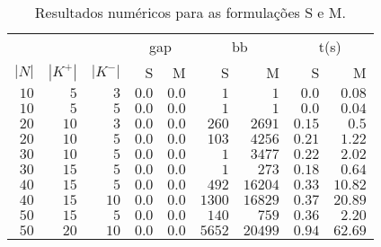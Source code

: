 \documentclass{article}
\begin{document}
\begin{table}[h]
	\centering
	\caption{Resultados numéricos para as formulações S e M.\label{tab:q2-table}}
	\begin{tabular}[h]{rrrrrrrrr}
		\toprule
		\multicolumn{3}{c}{}      & \multicolumn{2}{c}{gap}       & \multicolumn{2}{c}{bb}        & \multicolumn{2}{c}{t(s)}                                               \\
		\cmidrule(lr){4-5} \cmidrule(lr){6-7} \cmidrule(lr){8-9}
		\multicolumn{1}{c}{$|N|$} & \multicolumn{1}{c}{$|K^{+}|$} & \multicolumn{1}{c}{$|K^{-}|$} & S                        & M     & S      & M       & S      & M       \\
		\midrule
		$10$                      & $5$                           & $3$                           & $0.0$                    & $0.0$ & $1$    & $1$     & $0.0$  & $0.08$  \\
		$10$                      & $5$                           & $5$                           & $0.0$                    & $0.0$ & $1$    & $1$     & $0.0$  & $0.04$  \\
		$20$                      & $10$                          & $3$                           & $0.0$                    & $0.0$ & $260$  & $2691$  & $0.15$ & $0.5$   \\
		$20$                      & $10$                          & $5$                           & $0.0$                    & $0.0$ & $103$  & $4256$  & $0.21$ & $1.22$  \\
		$30$                      & $10$                          & $5$                           & $0.0$                    & $0.0$ & $1$    & $3477$  & $0.22$ & $2.02$  \\
		$30$                      & $15$                          & $5$                           & $0.0$                    & $0.0$ & $1$    & $273$   & $0.18$ & $0.64$  \\
		$40$                      & $15$                          & $5$                           & $0.0$                    & $0.0$ & $492$  & $16204$ & $0.33$ & $10.82$ \\
		$40$                      & $15$                          & $10$                          & $0.0$                    & $0.0$ & $1300$ & $16829$ & $0.37$ & $20.89$ \\
		$50$                      & $15$                          & $5$                           & $0.0$                    & $0.0$ & $140$  & $759$   & $0.36$ & $2.20$  \\
		$50$                      & $20$                          & $10$                          & $0.0$                    & $0.0$ & $5652$ & $20499$ & $0.94$ & $62.69$ \\
		\bottomrule
	\end{tabular}
\end{table}
\end{document}
